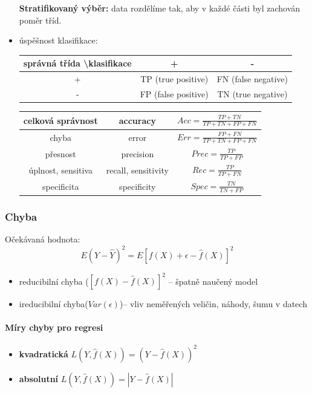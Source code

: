 \documentclass[11pt]{report} %
\numberwithin{equation}{section}
\begin{document}
\begin{itemize}
	\textbf{Stratifikovaný výběr:} data rozdělíme tak, aby v každé části byl zachován poměr tříd.
	\item úspěšnost klasifikace:
	\bigskip
	\begin{table}[H]
		\centering
		\begin{tabular}{|c|c|c|}
			\hline
			správná třída \textbackslash klasifikace & + & - \\ \hline
			+ & TP (true positive) & FN (false negative) \\ \hline
			- & FP (false positive) & TN (true negative) \\ \hline
		\end{tabular}
	\end{table}
	\bigskip
	\begin{table}[H]
		\centering
		\begin{tabular}{|c|c|c|}
			\hline
			celková správnost & accuracy & $Acc = \frac{TP + TN}{TP + TN + FP + FN}$ \\ \hline
			chyba & error & $Err = \frac{FP + FN}{TP + TN + FP + FN}$ \\ \hline
			přesnost & precision & $Prec = \frac{TP}{TP + FP}$ \\ \hline
			úplnost, sensitiva & recall, sensitivity & $Rec = \frac{TP}{TP + FN}$ \\ \hline
			specificita & specificity & $Spec = \frac{TN}{TN + FP}$ \\ \hline
		\end{tabular}
	\end{table}
	
	
\end{itemize}

\subsubsection{Chyba}
Očekávaná hodnota:
$$E(Y-\hat{Y})^2 = E[f(X) + \epsilon - \hat{f}(X)]^2$$

\begin{itemize}		
	\item reducibilní chyba ($[f(X) - \hat{f}(X)]^2$ -- špatně naučený model
	\item ireducibilní chyba($Var(\epsilon)$)-- vliv neměřených veličin, náhody, šumu v datech 
\end{itemize}

\paragraph{Míry chyby pro regresi}
\begin{itemize}
	\item \textbf{kvadratická} $L(Y, \hat{f}(X)) = (Y - \hat{f}(X))^2 $
	\item \textbf{absolutní} $L(Y, \hat{f}(X)) = |Y - \hat{f}(X)| $	
\end{itemize}
\end{document}
